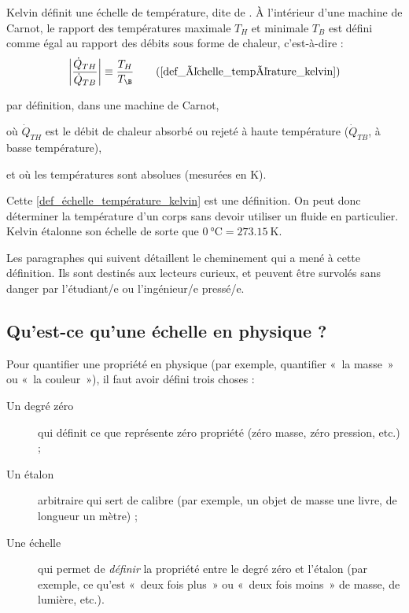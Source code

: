 		Kelvin définit une échelle de température, dite de . À l’intérieur d’une machine de Carnot, le rapport des températures maximale $T_H$ et minimale $T_B$ est défini comme égal au rapport des débits sous forme de chaleur, c’est-à-dire :
		\begin{equation}
			\left| \frac{\dot Q_{TH}}{\dot Q_{TB}} \right| \equiv \frac{T_H}{T_\B } \tag{\ref{def_échelle_température_kelvin}}
		\end{equation}
		\begin{equationterms}
			\item par définition, dans une machine de Carnot,
			\item où \tab $\dot Q_{TH}$ \tab est le débit de chaleur absorbé ou rejeté à haute température ($\dot Q_{TB}$, à basse température),
			\item et où les températures sont absolues (mesurées en \si{\kelvin}).
		\end{equationterms}

		Cette \cref{def_échelle_température_kelvin} est une définition. On peut donc déterminer la température d’un corps sans devoir utiliser un fluide en particulier. Kelvin étalonne son échelle de sorte que $\SI{0}{\degreeCelsius} = \SI{273,15}{\kelvin}$.
		
		Les paragraphes qui suivent détaillent le cheminement qui a mené à cette définition. Ils sont destinés aux lecteurs curieux, et peuvent être survolés sans danger par l’étudiant/e ou l’ingénieur/e pressé/e.


	\subsection{Qu’est-ce qu’une échelle en physique ?}
	
		Pour quantifier une propriété en physique (par exemple, quantifier «~la masse~» ou «~la couleur~»), il faut avoir défini trois choses :
		
		\begin{description}
			\item [Un degré zéro] qui définit ce que représente zéro propriété (zéro masse, zéro pression, etc.) ;
			\item [Un étalon] arbitraire qui sert de calibre (par exemple, un objet de masse une livre, de longueur un mètre) ;
			\item [Une échelle] qui permet de \emph{définir} la propriété entre le degré zéro et l’étalon (par exemple, ce qu’est «~deux fois plus~» ou «~deux fois moins~» de masse, de lumière, etc.).
		\end{description}



